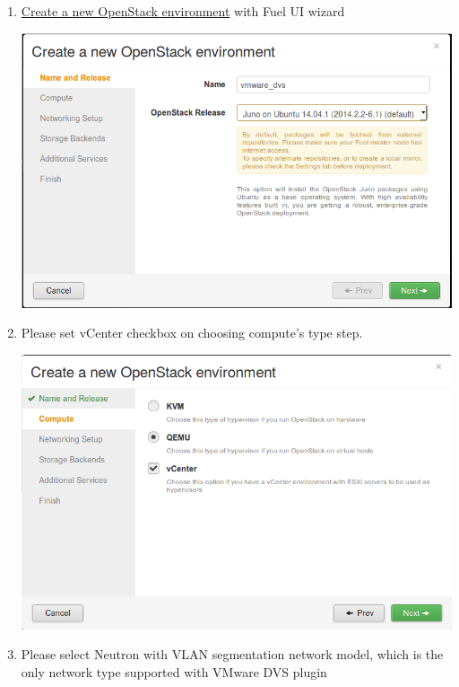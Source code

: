 \documentclass{article}
\begin{document}
\begin{enumerate}

\item \href{https://docs.mirantis.com/openstack/fuel/fuel-6.1/user-guide.html#create-a-new-openstack-environment}{Create a new OpenStack environment} with Fuel UI wizard

\includegraphics[scale=0.8]{pics/create}

\item Please set vCenter checkbox on choosing compute's type step.

\includegraphics[scale=0.8]{pics/compute}

\newpage

\item Please select Neutron with VLAN segmentation network model, which is the only network type supported with VMware DVS plugin


\end{enumerate}
\end{document}
